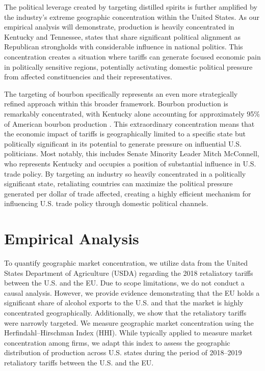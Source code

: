 \documentclass[AEJ]{AEA}
\begin{document}
	The political leverage created by targeting distilled spirits is further amplified by the industry's extreme geographic concentration within the United States. As our empirical analysis will demonstrate, production is heavily concentrated in Kentucky and Tennessee, states that share significant political alignment as Republican strongholds with considerable influence in national politics. This concentration creates a situation where tariffs can generate focused economic pain in politically sensitive regions, potentially activating domestic political pressure from affected constituencies and their representatives.
	
	The targeting of bourbon specifically represents an even more strategically refined approach within this broader framework. Bourbon production is remarkably concentrated, with Kentucky alone accounting for approximately 95\% of American bourbon production \citep{zhang_investigation_2024}. This extraordinary concentration means that the economic impact of tariffs is geographically limited to a specific state but politically significant in its potential to generate pressure on influential U.S. politicians. Most notably, this includes Senate Minority Leader Mitch McConnell, who represents Kentucky and occupies a position of substantial influence in U.S. trade policy. By targeting an industry so heavily concentrated in a politically significant state, retaliating countries can maximize the political pressure generated per dollar of trade affected, creating a highly efficient mechanism for influencing U.S. trade policy through domestic political channels.
	
	\section{Empirical Analysis}
	
	To quantify geographic market concentration, we utilize data from the United States Department of Agriculture (USDA) regarding the 2018 retaliatory tariffs between the U.S. and the EU. Due to scope limitations, we do not conduct a causal analysis. However, we provide evidence demonstrating that the EU holds a significant share of alcohol exports to the U.S. and that the market is highly concentrated geographically. Additionally, we show that the retaliatory tariffs were narrowly targeted.
	We measure geographic market concentration using the Herfindahl–Hirschman Index (HHI). While typically applied to measure market concentration among firms, we adapt this index to assess the geographic distribution of production across U.S. states during the period of 2018–2019 retaliatory tariffs between the U.S. and the EU.
	
\end{document}
